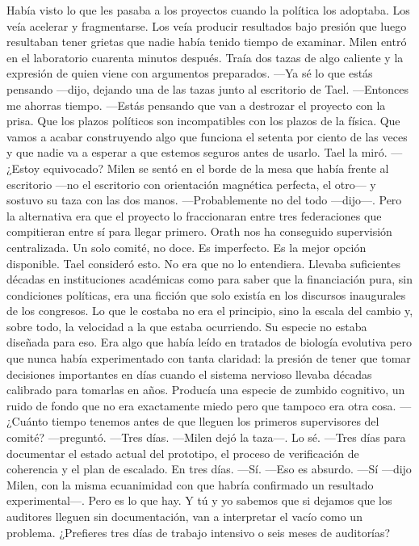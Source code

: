 \documentclass[11pt,a5paper,twoside]{book}
\begin{document}
Había visto lo que les pasaba a los proyectos cuando la política los adoptaba. Los veía acelerar y fragmentarse. Los veía producir resultados bajo presión que luego resultaban tener grietas que nadie había tenido tiempo de examinar.
Milen entró en el laboratorio cuarenta minutos después. Traía dos tazas de algo caliente y la expresión de quien viene con argumentos preparados.
—Ya sé lo que estás pensando —dijo, dejando una de las tazas junto al escritorio de Tael.
—Entonces me ahorras tiempo.
—Estás pensando que van a destrozar el proyecto con la prisa. Que los plazos políticos son incompatibles con los plazos de la física. Que vamos a acabar construyendo algo que funciona el setenta por ciento de las veces y que nadie va a esperar a que estemos seguros antes de usarlo.
Tael la miró.
—¿Estoy equivocado?
Milen se sentó en el borde de la mesa que había frente al escritorio —no el escritorio con orientación magnética perfecta, el otro— y sostuvo su taza con las dos manos.
—Probablemente no del todo —dijo—. Pero la alternativa era que el proyecto lo fraccionaran entre tres federaciones que compitieran entre sí para llegar primero. Orath nos ha conseguido supervisión centralizada. Un solo comité, no doce. Es imperfecto. Es la mejor opción disponible.
Tael consideró esto.
No era que no lo entendiera. Llevaba suficientes décadas en instituciones académicas como para saber que la financiación pura, sin condiciones políticas, era una ficción que solo existía en los discursos inaugurales de los congresos. Lo que le costaba no era el principio, sino la escala del cambio y, sobre todo, la velocidad a la que estaba ocurriendo.
Su especie no estaba diseñada para eso. Era algo que había leído en tratados de biología evolutiva pero que nunca había experimentado con tanta claridad: la presión de tener que tomar decisiones importantes en días cuando el sistema nervioso llevaba décadas calibrado para tomarlas en años. Producía una especie de zumbido cognitivo, un ruido de fondo que no era exactamente miedo pero que tampoco era otra cosa.
—¿Cuánto tiempo tenemos antes de que lleguen los primeros supervisores del comité? —preguntó.
—Tres días. —Milen dejó la taza—. Lo sé.
—Tres días para documentar el estado actual del prototipo, el proceso de verificación de coherencia y el plan de escalado. En tres días.
—Sí.
—Eso es absurdo.
—Sí —dijo Milen, con la misma ecuanimidad con que habría confirmado un resultado experimental—. Pero es lo que hay. Y tú y yo sabemos que si dejamos que los auditores lleguen sin documentación, van a interpretar el vacío como un problema. ¿Prefieres tres días de trabajo intensivo o seis meses de auditorías?
\end{document}
